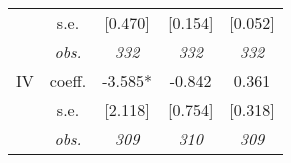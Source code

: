 \begin{table}[H]
\begin{centering}
\begin{tabular}{ r c ccc}
	 & s.e.	 & [0.470]	 & [0.154]	 & [0.052]	\\
	 & \textit{obs.}	 & \textit{332}	 & \textit{332}	 & \textit{332}	\\
IV	 & coeff.	 & -3.585*	 & -0.842	 & 0.361	\\
	 & s.e.	 & [2.118]	 & [0.754]	 & [0.318]	\\
	 & \textit{obs.}	 & \textit{309}	 & \textit{310}	 & \textit{309}	\\
\hline 
\end{tabular}
\par\end{centering}
\end{table}
